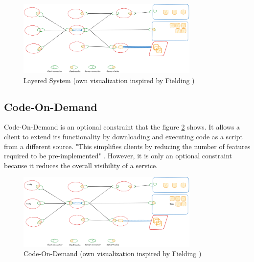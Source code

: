 \begin{figure}[!h]
\centering
\includegraphics[width=0.8\textwidth, keepaspectratio]{figures/layered-system.png}
\caption{Layered System (own visualization inspired by Fielding \cite{fielding2000})}
\label{fig:layered-system}
\end{figure}

\subsection{Code-On-Demand}

Code-On-Demand is an optional constraint that the figure \ref{fig:code-on-demand} shows. It allows a client to extend its functionality by downloading and executing code as a script from a different source. "This simplifies clients by reducing the number of features required to be pre-implemented" \cite{fielding2000}. However, it is only an optional constraint because it reduces the overall visibility of a service.
 
\begin{figure}[!h]
\centering
\includegraphics[width=0.8\textwidth, keepaspectratio]{figures/code-on-demand.png}
\caption{Code-On-Demand (own visualization inspired by Fielding \cite{fielding2000})}
\label{fig:code-on-demand}
\end{figure}